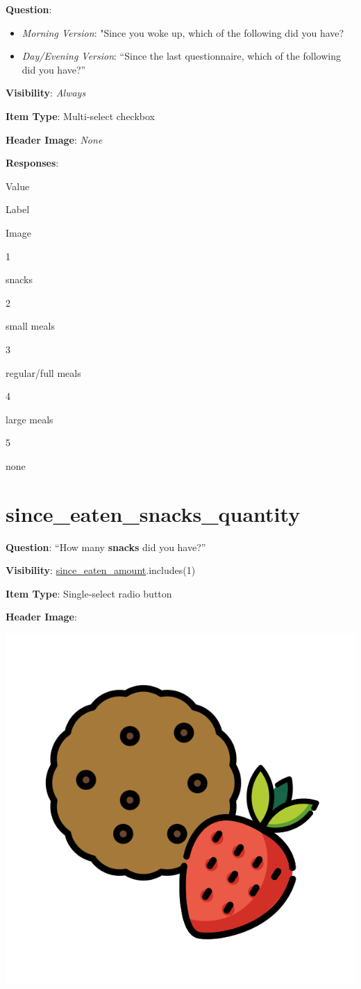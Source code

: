 \documentclass[]{book}
\providecommand{\tightlist}{%
  \setlength{\itemsep}{0pt}\setlength{\parskip}{0pt}}
\begin{document}
\textbf{Question}:

\begin{itemize}
\tightlist
\item
  \emph{Morning Version}: "Since you woke up, which of the following did you have?
\item
  \emph{Day/Evening Version}: ``Since the last questionnaire, which of the following did you have?''
\end{itemize}

\textbf{Visibility}: \emph{Always}

\textbf{Item Type}: Multi-select checkbox

\textbf{Header Image}: \emph{None}

\textbf{Responses}:

Value

Label

Image

1

snacks

2

small meals

3

regular/full meals

4

large meals

5

none

\hypertarget{since_eaten_snacks_quantity}{%
\section{since\_eaten\_snacks\_quantity}\label{since_eaten_snacks_quantity}}

\textbf{Question}: ``How many \textbf{snacks} did you have?''

\textbf{Visibility}: \protect\hyperlink{since_eaten_amount}{since\_eaten\_amount}.includes(1)

\textbf{Item Type}: Single-select radio button

\textbf{Header Image}:

\begin{flushleft}\includegraphics[width=0.33\linewidth]{downloadFigs4latex_NIMH_Applet_Codebook/since_eaten_snacks_quantity_headerImg} \end{flushleft}
\end{document}
